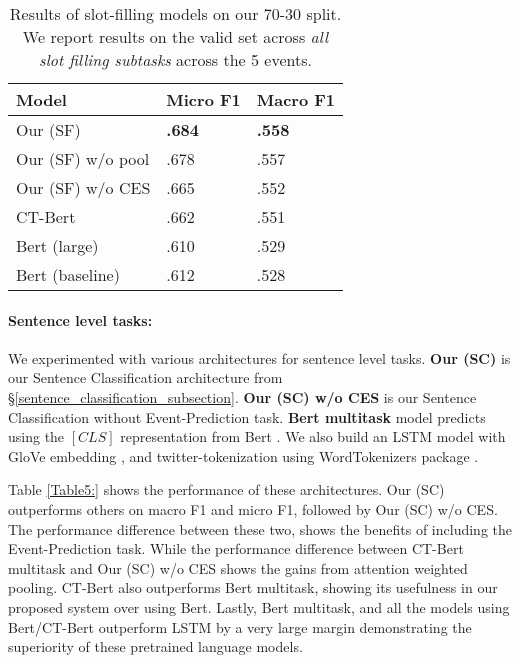 \documentclass[11pt,a4paper]{article}
\begin{document}
\begin{table}
 \begin{center}

  \begin{tabular}{p{3cm}p{1.5cm}p{1.5cm}}
    \hline
    Model & Micro F1 & Macro F1\\
\hline
   Our (SF)          & \textbf{.684} & \textbf{.558} \\
   Our (SF) w/o pool & .678          & .557 \\
   Our (SF) w/o CES  & .665          & .552 \\
   CT-Bert           & .662          & .551 \\
   Bert (large)      & .610          & .529 \\ 
   Bert (baseline)   & .612          & .528 \\ 
   \hline

  \end{tabular}
  \caption{\label{Table4:} Results of slot-filling models on our 70-30 split. We report results on the valid set across \textit{all slot filling subtasks} across the 5 events.}
 \end{center}
\end{table}

\paragraph{Sentence level tasks:}

We experimented with various architectures for sentence level tasks. \textbf{Our (SC)} is our Sentence Classification architecture from \S\ref{sentence_classification_subsection}. \textbf{Our (SC) w/o CES} is our Sentence Classification without Event-Prediction task. \textbf{Bert multitask} model predicts using the $[CLS]$ representation from Bert \cite{bertpaper}. We also build an LSTM model \cite{lstmpaper} with GloVe embedding \cite{pennington2014glove}, and twitter-tokenization using WordTokenizers package \cite{worktokenizers}.

Table \ref{Table5:} shows the performance of these architectures. Our (SC) outperforms others on macro F1 and micro F1, followed by Our (SC) w/o CES. The performance difference between these two, shows the benefits of including the Event-Prediction task. While the performance difference between CT-Bert multitask and Our (SC) w/o CES shows the gains from attention weighted pooling. CT-Bert also outperforms Bert multitask, showing its usefulness in our proposed system over using Bert. Lastly, Bert multitask, and all the models using Bert/CT-Bert outperform LSTM by a very large margin demonstrating the superiority of these pretrained language models.
\end{document}
